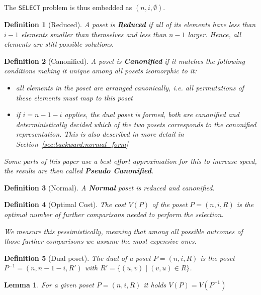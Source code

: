 \documentclass[10pt,journal,compsoc]{IEEEtran}
\newtheorem{lemma}{Lemma}
\newtheorem{definition}{Definition}
\begin{document}
The \texttt{SELECT} problem is thus embedded as $(n, i, \emptyset)$.

\begin{definition}[Reduced] \label{definition:reduced_poset}
  A poset is \textbf{Reduced} if all of its elements have less than $i - 1$ elements smaller than themselves and less than $n - 1$ larger.
  Hence, all elements are still possible solutions.
\end{definition}

\begin{definition}[Canonified]
  A poset is \textbf{Canonified} if it matches the following conditions making it unique among all posets isomorphic to it:
  \begin{itemize}
    \item all elements in the poset are arranged canonically, i.e. all permutations of these elements must map to this poset
    \item if $i = n - 1 - i$ applies, the dual poset is formed, both are canonified and deterministically decided which of the two posets corresponds to the canonified representation. This is also described in more detail in Section~\ref{sec:backward:normal_form}
  \end{itemize}

  Some parts of this paper use a best effort approximation for this to increase speed, the results are then called \textbf{Pseudo Canonified}.
\end{definition}

\begin{definition}[Normal]
  A \textbf{Normal} poset is reduced and canonified.
\end{definition}

\begin{definition}[Optimal Cost]
  The cost $V(P)$ of the poset $P = (n, i, R)$ is the optimal number of further comparisons needed to perform the selection.

  We measure this pessimistically, meaning that among all possible outcomes of those further comparisons we assume the most expensive ones.
\end{definition}

\begin{definition}[Dual poset] \label{definition:dual_poset}
  The dual of a poset $P = (n, i, R)$ is the poset $P^{-1} = (n, n - 1 - i, R')$ with $R' = \{(u,v) \; \vert \; (v,u) \in R\}$.
\end{definition}

\begin{lemma} \label{lemma:dual_poset_allowed}
  For a given poset $P = (n, i, R)$ it holds $V(P) = V(P^{-1})$
\end{lemma}
\end{document}
